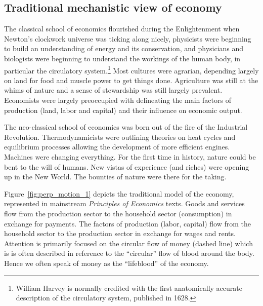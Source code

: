 \subsection{Traditional mechanistic view of economy}
\label{sec:mechanistic}

The classical school of economics flourished during the Enlightenment
when Newton's clockwork universe was ticking along nicely,
physicists were beginning to build an understanding of
energy and its conservation, and
physicians and biologists were beginning to understand
the workings of the human body,
in particular the circulatory system.\footnote{William
Harvey is normally credited with the first anatomically
accurate description of the circulatory system, 
published in 1628.\cite{Harvey1889}
}
Most cultures were agrarian,
depending largely on land for food
and muscle power to get things done.
Agriculture was still at the whims of nature and
a sense of stewardship was still largely prevalent.
Economists were largely preoccupied with delineating
the main factors of production (land, labor and capital)
and their influence on economic output.

The neo-classical school of economics 
was born out of the fire of the Industrial Revolution.
Thermodynamicists were outlining theories on 
heat cycles and equilibrium processes allowing
the development of more efficient engines.
Machines were changing everything.
For the first time in history,
nature could be bent to the will of humans.
New vistas of experience (and riches) were
opening up in the New World.
The bounties of nature were there for the taking.

Figure~\ref{fig:perp_motion_1} 
depicts the traditional model of the economy,
represented in mainstream \emph{Principles of Economics} texts.
Goods and services flow from the production sector
to the household sector (consumption)
in exchange for payments.
The factors of production (labor, capital)
flow from the household sector to the
production sector in exchange for wages and rents.
Attention is primarily focused on the circular flow
of money (dashed line) which is
is often described in reference to 
the ``circular'' flow of blood around the body.
Hence we often speak of money as the
``lifeblood'' of the economy.

